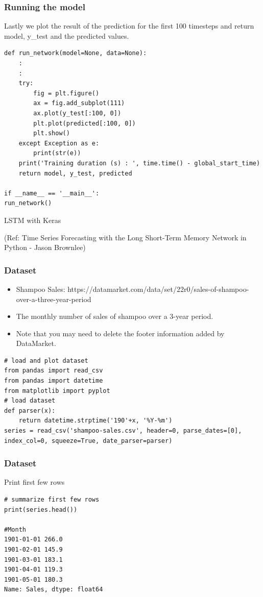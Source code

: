 \begin{frame}[fragile] \frametitle{Running the model}
Lastly we plot the result of the prediction for the first 100 timesteps and return model, y\_test and the predicted values.
\begin{lstlisting}
def run_network(model=None, data=None):
	:
	:
    try:
        fig = plt.figure()
        ax = fig.add_subplot(111)
        ax.plot(y_test[:100, 0])
        plt.plot(predicted[:100, 0])
        plt.show()
    except Exception as e:
        print(str(e))
    print('Training duration (s) : ', time.time() - global_start_time)
    return model, y_test, predicted
    
if __name__ == '__main__':
run_network()
\end{lstlisting}           
\end{frame}

\begin{frame}
  \begin{center}
    {\Large LSTM with Keras}
    
(Ref: Time Series Forecasting with the Long Short-Term Memory Network in Python - Jason Brownlee)
  \end{center}
\end{frame}



\begin{frame}[fragile] \frametitle{Dataset}
\begin{itemize}
\item Shampoo Sales: https://datamarket.com/data/set/22r0/sales-of-shampoo-over-a-three-year-period
\item The monthly number of sales of shampoo over a 3-year period.
\item Note that you may need to delete the footer information added by DataMarket.
\end{itemize}
\begin{lstlisting}
# load and plot dataset
from pandas import read_csv
from pandas import datetime
from matplotlib import pyplot
# load dataset
def parser(x):
	return datetime.strptime('190'+x, '%Y-%m')
series = read_csv('shampoo-sales.csv', header=0, parse_dates=[0], index_col=0, squeeze=True, date_parser=parser)
\end{lstlisting}   
\end{frame}

\begin{frame}[fragile] \frametitle{Dataset}
Print first few rows
\begin{lstlisting}
# summarize first few rows
print(series.head())

#Month
1901-01-01 266.0
1901-02-01 145.9
1901-03-01 183.1
1901-04-01 119.3
1901-05-01 180.3
Name: Sales, dtype: float64
\end{lstlisting}   
\end{frame}

